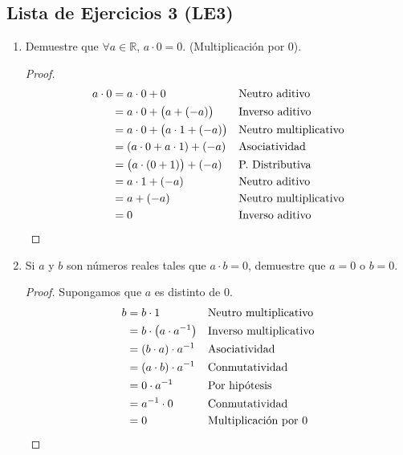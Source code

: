 \documentclass[11pt]{article}
\newcommand{\R}{\mathbb{R}}
\begin{document}
\subsection*{Lista de Ejercicios 3 (LE3)}
    \begin{enumerate}[label=\alph*)]

    \item Demuestre que $\forall a\in \R$, $a \cdot 0 = 0$. (Multiplicación por $0$).
    \vspace{-1em}\begin{proof} 
        \begin{align*}
            a\cdot0&=a\cdot0+0 && \text{Neutro aditivo}\\
            &=a\cdot0+\bigl(a+\left(-a\right)\bigr) && \text{Inverso aditivo}\\
            &=a\cdot0+\bigl(a\cdot1+\left(-a\right)\bigr) && \text{Neutro multiplicativo}\\
            &=\left(a\cdot0+a\cdot1\right)+\left(-a\right) && \text{Asociatividad}\\
            &=\bigl(a\cdot\left(0+1\right)\bigr)+\left(-a\right) && \text{P. Distributiva}\\
            &=a\cdot1+\left(-a\right) && \text{Neutro aditivo}\\
            &=a+\left(-a\right) && \text{Neutro multiplicativo}\\
            &=0 && \text{Inverso aditivo} \qedhere
        \end{align*}    
    \end{proof} \vspace{-1em}

    \item Si $a$ y $b$ son números reales tales que $ a \cdot b = 0 $, demuestre que $a=0$ o $b=0$.
    
    \vspace{-1em}\begin{proof} 
    Supongamos que $a$ es distinto de $0$.
    \begin{align*}
    b &= b \cdot 1	&& \text{Neutro multiplicativo} \\
    &= b \cdot  \left(a \cdot a^{-1}  \right) 	&& \text{Inverso multiplicativo} \\
    &= \left(b\cdot a\right)  \cdot a^{-1}	&& \text{Asociatividad} \\
    &= \left(a\cdot b\right)  \cdot a^{-1}	&& \text{Conmutatividad} \\
    &= 0 \cdot a^{-1}	&& \text{Por hipótesis}\\
    &= a^{-1} \cdot 0	&& \text{Conmutatividad}\\
    &= 0 && \text{Multiplicación por $0$} \qedhere
    \end{align*}    
    \end{proof} \vspace{-1em}


\end{enumerate}
\end{document}
